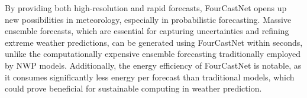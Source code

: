 By providing both high-resolution and rapid forecasts, FourCastNet opens up new possibilities in meteorology, especially in probabilistic forecasting. Massive ensemble forecasts, which are essential for capturing uncertainties and refining extreme weather predictions, can be generated using FourCastNet within seconds, unlike the computationally expensive ensemble forecasting traditionally employed by NWP models. Additionally, the energy efficiency of FourCastNet is notable, as it consumes significantly less energy per forecast than traditional models, which could prove beneficial for sustainable computing in weather prediction.




